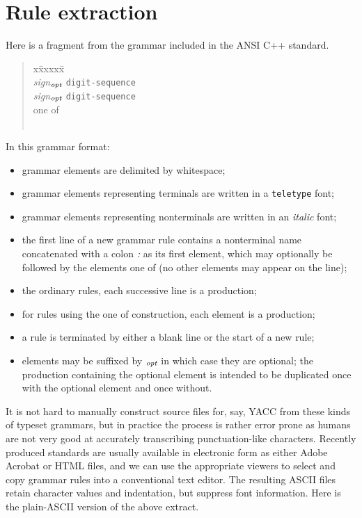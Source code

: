 \documentclass[11pt]{article}
\begin{document}
\section{Rule extraction}
Here is a fragment from the grammar included in the ANSI C++ standard.
\begin{quote}
\begin{tabbing}
x\=xxxxx\=\kill
          \\
                \> {\em sign}$_{\mbox{\scriptsize\em opt}}$ {\tt digit-sequence}\\
                \> {\em sign}$_{\mbox{\scriptsize\em opt}}$ {\tt digit-sequence}\\[2ex]
           {\footnotesize one of}\\
                 \>\>{\tt +}\quad{\tt -}\\
\end{tabbing}
\end{quote}
In this grammar format:
\begin{itemize}
\item grammar elements are delimited by whitespace;
\item grammar elements representing terminals are written in a {\tt teletype} font;
\item grammar elements representing nonterminals are written in an {\it italic} font;
\item the first line of a new grammar rule contains a nonterminal name
concatenated with a colon {\em :} as its first element, which may
optionally be followed by the elements {\footnotesize one of} (no
other elements may appear on the line);
\item the ordinary rules, each successive line is a production; 
\item for rules using the {\footnotesize one of} construction, each
element is a production;
\item a rule is terminated by either a blank line or the start of a
new rule;
\item elements may be suffixed by $_{\mbox{\scriptsize\em opt}}$ in
which case they are optional; the production containing the optional
element is intended to be duplicated once with the optional element
and once without.
\end{itemize}

It is not hard to manually construct source files for, say, YACC from
these kinds of typeset grammars, but in practice the process is rather
error prone as humans are not very good at accurately transcribing
punctuation-like characters.  Recently produced standards are usually
available in electronic form as either Adobe Acrobat or HTML files,
and we can use the appropriate viewers to select and copy grammar
rules into a conventional text editor. The resulting ASCII files
retain character values and indentation, but suppress font information.
Here is the plain-ASCII version of the above extract.
\end{document}
